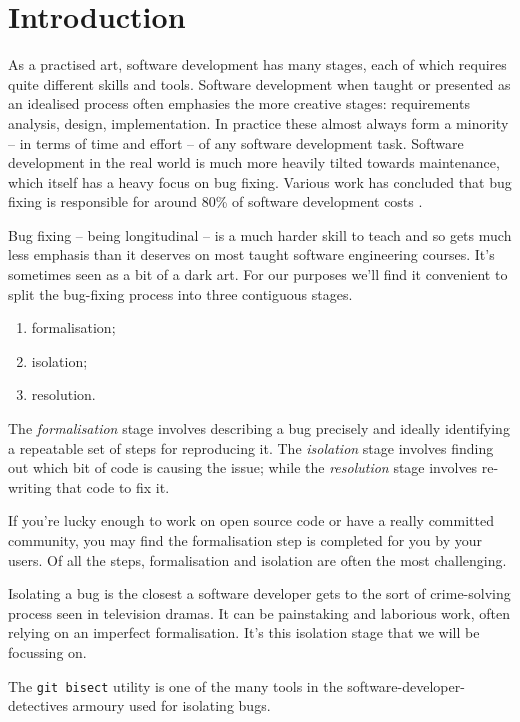 \documentclass[pdflatex, sn-mathphys, referee]{sn-jnl}%
\theoremstyle{thmstyleone}%
\theoremstyle{thmstyletwo}%
\theoremstyle{thmstylethree}%
\def\code{\tt}
\theoremstyle{thmstyleone}
\begin{document}
\section{Introduction}\label{sec:introduction}

As a practised art, software development has many stages, each of which requires quite different skills and tools. Software development when taught or presented as an idealised process often emphasies the more creative stages: requirements analysis, design, implementation. In practice these almost always form a minority -- in terms of time and effort -- of any software development task. Software development in the real world is much more heavily tilted towards maintenance, which itself has a heavy focus on bug fixing. Various work has concluded that bug fixing is responsible for around 80\% of software development costs \cite{nist2002}.

Bug fixing -- being longitudinal -- is a much harder skill to teach and so gets much less emphasis than it deserves on most taught software engineering courses. It's sometimes seen as a bit of a dark art. For our purposes we'll find it convenient to split the bug-fixing process into three contiguous stages.

\begin{enumerate}
\item formalisation;
\item isolation;
\item resolution.
\end{enumerate}

The {\it formalisation\/} stage involves describing a bug precisely and ideally identifying a repeatable set of steps for reproducing it. The {\it isolation\/} stage involves finding out which bit of code is causing the issue; while the {\it resolution\/} stage involves re-writing that code to fix it.

If you're lucky enough to work on open source code or have a really committed community, you may find the formalisation step is completed for you by your users. Of all the steps, formalisation and isolation are often the most challenging.

Isolating a bug is the closest a software developer gets to the sort of crime-solving process seen in television dramas. It can be painstaking and laborious work, often relying on an imperfect formalisation. It's this isolation stage that we will be focussing on.

The {\code git bisect} utility is one of the many tools in the software-developer-detectives armoury used for isolating bugs.
\end{document}
